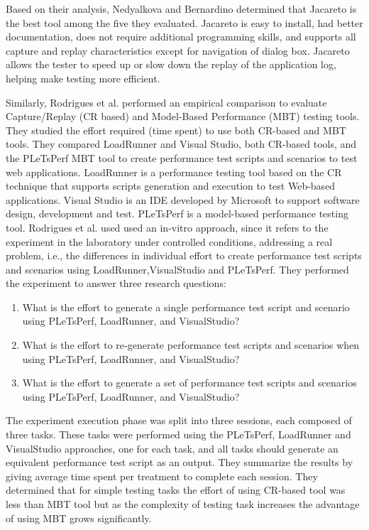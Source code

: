 \documentclass[12pt,journal]{IEEEtran}
\begin{document}
Based on their analysis, Nedyalkova and Bernardino determined that Jacareto is the best tool among the five they evaluated. Jacareto is easy to install, had better documentation, does not require additional programming skills, and supports all capture and replay characteristics except for navigation of dialog box. Jacareto allows the tester to speed up or slow down the replay of the application log, helping make testing more efficient.
\par
Similarly, Rodrigues et al. \cite{Rodrigues:2014:ECR:2652524.2652587} performed an empirical comparison to evaluate Capture/Replay (CR based) and Model-Based Performance (MBT) testing tools. They studied the effort required (time spent) to use both CR-based and MBT tools. They compared LoadRunner and Visual Studio, both CR-based tools, and the PLeTsPerf MBT tool to create performance test scripts and scenarios to test web applications. LoadRunner is a performance testing tool based on the CR technique that supports scripts generation and execution to test Web-based applications. Visual Studio is an IDE developed by Microsoft to support software design, development and test. PLeTsPerf is a model-based performance testing tool. Rodrigues et al. used used an in-vitro approach, since it refers to the experiment in the laboratory under controlled conditions, addressing a real problem, i.e., the differences in individual effort to create performance test scripts and scenarios using LoadRunner,VisualStudio and PLeTsPerf. They performed the experiment to answer three research questions:
\begin{enumerate}
\item What is the effort to generate a single performance test script and scenario using PLeTsPerf, LoadRunner, and VisualStudio?
\item What is the effort to re-generate performance test scripts and scenarios when using PLeTsPerf, LoadRunner, and VisualStudio?
\item What is the effort to generate a set of performance test scripts and scenarios using PLeTsPerf, LoadRunner, and VisualStudio?
\end{enumerate}
The experiment execution phase was split into three sessions, each composed of three tasks. These tasks were performed using the PLeTsPerf, LoadRunner  and VisualStudio approaches, one for each task, and all tasks should generate an equivalent performance test script as an output. They summarize the results by giving average time spent per treatment to complete each session. They determined that for simple testing tasks the effort of using CR-based tool was less than MBT tool but as the complexity of testing task increases the advantage of using MBT grows significantly.
\end{document}
